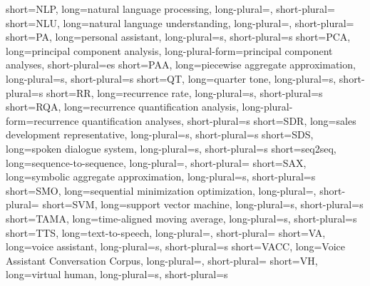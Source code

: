 	{short=NLP, 	long=natural language processing, 					long-plural=, short-plural=}
	{short=NLU, 	long=natural language understanding, 				long-plural=, short-plural=}
		{short=PA, 		long=personal assistant, 							long-plural=s, short-plural=s}
	{short=PCA,		long=principal component analysis, 					long-plural-form=principal component analyses, short-plural=es}
	{short=PAA,		long=piecewise aggregate approximation, 			long-plural=s, short-plural=s}
		{short=QT,	 	long=quarter tone, long-plural=s, short-plural=s}
		{short=RR,	 	long=recurrence rate,								long-plural=s, short-plural=s}
	{short=RQA,	 	long=recurrence quantification analysis,			long-plural-form=recurrence quantification analyses, short-plural=s}
	{short=SDR, 	long=sales development representative,				long-plural=s, short-plural=s}
	{short=SDS, 	long=spoken dialogue system, 						long-plural=s, short-plural=s}
	{short=seq2seq,	long=sequence-to-sequence,				 			long-plural=, short-plural=}
	{short=SAX,		long=symbolic aggregate approximation,				long-plural=s, short-plural=s}
	{short=SMO, 	long=sequential minimization optimization, 			long-plural=, short-plural=}
	{short=SVM, 	long=support vector machine, 						long-plural=s, short-plural=s}
	{short=TAMA, 	long=time-aligned moving average, 					long-plural=s, short-plural=s}
	{short=TTS, 	long=text-to-speech,								long-plural=, short-plural=}
		{short=VA, 		long=voice assistant, 								long-plural=s, short-plural=s}
	{short=VACC, 	long=Voice Assistant Conversation Corpus, 			long-plural=, short-plural=}
		{short=VH, 		long=virtual human, 								long-plural=s, short-plural=s}

\usepackage[	
	natbib=true,
	style=authoryear-comp,
	sorting=ynt, %
	hyperref=true,
	backend=biber,
	maxbibnames=99,
	giveninits=false,
	uniquename=false, %
	uniquelist=false,
	maxcitenames=2,
	mincitenames=1,
	parentracker=true,
	url=true,
	doi=true,
	isbn=true,
	eprint=true,
	backref=true,]
	{biblatex}


